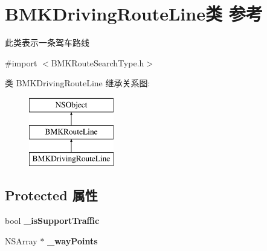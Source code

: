 \hypertarget{interface_b_m_k_driving_route_line}{}\section{B\+M\+K\+Driving\+Route\+Line类 参考}
\label{interface_b_m_k_driving_route_line}


此类表示一条驾车路线  




{\ttfamily \#import $<$B\+M\+K\+Route\+Search\+Type.\+h$>$}

类 B\+M\+K\+Driving\+Route\+Line 继承关系图\+:\begin{figure}[H]
\begin{center}
\leavevmode
\includegraphics[height=3.000000cm]{interface_b_m_k_driving_route_line}
\end{center}
\end{figure}
\subsection*{Protected 属性}
\begin{DoxyCompactItemize}
\item 
\hypertarget{interface_b_m_k_driving_route_line_ac5d75fa8fdd883982c7870e821b93da0}{}bool {\bfseries \+\_\+is\+Support\+Traffic}\label{interface_b_m_k_driving_route_line_ac5d75fa8fdd883982c7870e821b93da0}

\item 
\hypertarget{interface_b_m_k_driving_route_line_a371d37ca24cff8e33b6f1540fdbab3a4}{}N\+S\+Array $\ast$ {\bfseries \+\_\+way\+Points}\label{interface_b_m_k_driving_route_line_a371d37ca24cff8e33b6f1540fdbab3a4}

\end{DoxyCompactItemize}
